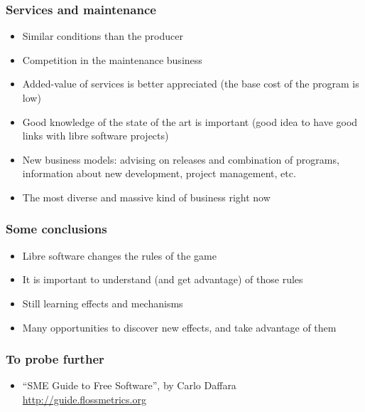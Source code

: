 
\begin{frame}
\frametitle{Services and maintenance}

\begin{itemize}
\item Similar conditions than the producer
\item Competition in the maintenance business
\item Added-value of services is better appreciated (the base cost of the program is low)
\item Good knowledge of the state of the art is important (good idea to have good links with libre software projects)
\item New business models: advising on releases and combination of programs, information about new development, project management, etc.
\item The most diverse and massive kind of business right now
\end{itemize}
\end{frame}


\begin{frame}
\frametitle{Some conclusions}

\begin{itemize}
\item Libre software changes the rules of the game
\item It is important to understand (and get advantage) of those rules
\item Still learning effects and mechanisms
\item Many opportunities to discover new effects, and take advantage of them
\end{itemize}
\end{frame}


\begin{frame}
\frametitle{To probe further}

\begin{itemize}
\item ``SME Guide to Free Software'', by Carlo Daffara \\
  \url{http://guide.flossmetrics.org}
\end{itemize}
\end{frame}
